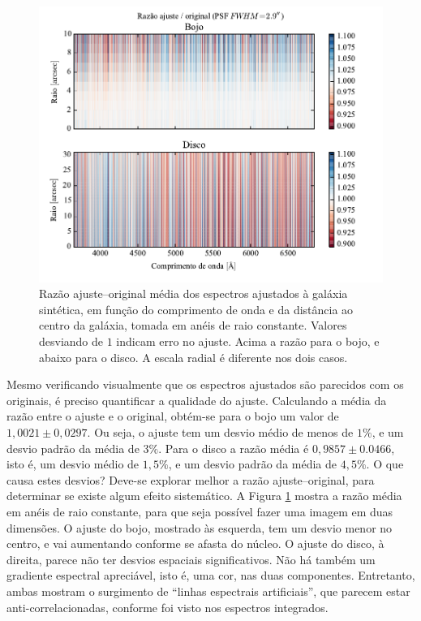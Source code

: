 \begin{figure}
	\includegraphics{figuras/simulation_error}
	\caption[Razão ajuste--original dos espectros ajustados à galáxia sintética.]
	{Razão ajuste--original média dos espectros ajustados à galáxia sintética, em
	função do comprimento de onda e da distância ao centro da galáxia, tomada em
	anéis de raio constante. Valores desviando de $1$ indicam erro no ajuste.
	Acima a razão para o bojo, e abaixo para o disco. A escala radial é
	diferente nos dois casos.}
	\label{fig:testFitError}
\end{figure}

Mesmo verificando visualmente que os espectros ajustados são parecidos com os
originais, é preciso quantificar a qualidade do ajuste. Calculando a média da
razão entre o ajuste e o original, obtém-se para o bojo um valor de $1,0021 \pm
0,0297$. Ou seja, o ajuste tem um desvio médio de menos de $1\%$, e um desvio
padrão da média de $3\%$. Para o disco a razão média é $0,9857 \pm 0.0466$, isto
é, um desvio médio de $1,5\%$, e um desvio padrão da média de $4,5\%$. O que
causa estes desvios? Deve-se explorar melhor a razão ajuste--original, para
determinar se existe algum efeito sistemático. A Figura \ref{fig:testFitError}
mostra a razão média em anéis de raio constante, para que seja possível fazer
uma imagem em duas dimensões. O ajuste do bojo, mostrado às esquerda, tem um
desvio menor no centro, e vai aumentando conforme se afasta do núcleo. O ajuste
do disco, à direita, parece não ter desvios espaciais significativos. Não há
também um gradiente espectral apreciável, isto é, uma cor, nas duas componentes.
Entretanto, ambas mostram o surgimento de ``linhas espectrais artificiais'', que
parecem estar anti-correlacionadas, conforme foi visto nos espectros integrados.

